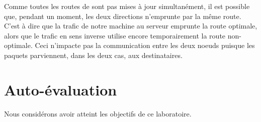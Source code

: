 \documentclass[11pt,a4paper]{article}
\begin{document}
Comme toutes les routes de sont pas mises à jour simultanément, il est possible que, pendant un moment, les deux directions n'emprunte par la même route. C'est à dire que la trafic de notre machine au serveur emprunte la route optimale, alors que le trafic en sens inverse utilise encore temporairement la route non-optimale. Ceci n'impacte pas la communication entre les deux noeuds puisque les paquets parviennent, dans les deux cas, aux destinataires.

\section{Auto-évaluation}

Nous considérons avoir atteint les objectifs de ce laboratoire.
\end{document}

